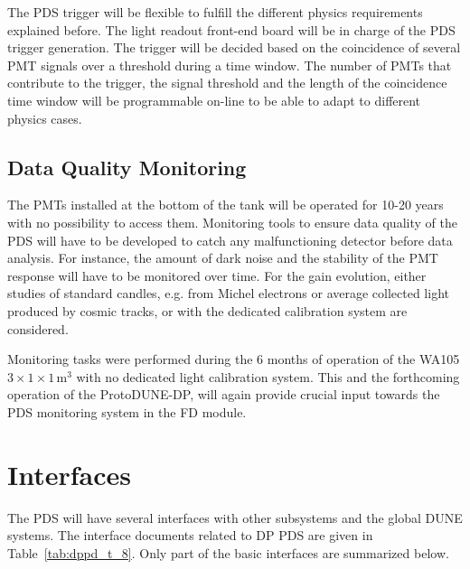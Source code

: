 The PDS trigger will be flexible to fulfill the different physics requirements explained before. The light readout front-end board will be in charge of the PDS trigger generation. The trigger will be decided based on the coincidence of several PMT signals over a threshold during a time window. The number of PMTs that contribute to the trigger, the signal threshold and the length of the coincidence time window will be programmable on-line to be able to adapt to different physics cases.


\subsection{Data Quality Monitoring}
\label{sec:fddp-pd-7.3}

The PMTs installed at the bottom of the tank will be operated for 10-20 years with no possibility to access them. Monitoring tools to ensure data quality of the PDS will have to be developed to catch any malfunctioning detector before data analysis. For instance, the amount of dark noise and the stability of the PMT response will have to be monitored over time. For the gain evolution, either studies of standard candles, e.g. from Michel electrons or average collected light produced by cosmic tracks, or with the dedicated calibration system are considered.

Monitoring tasks were performed during the 6 months of operation of the WA105 $3\times1\times1$\,m$^3$ with no dedicated light calibration system. This and the forthcoming operation of the ProtoDUNE-DP, will again provide crucial input towards the PDS monitoring system in the FD module.

\section{Interfaces}
\label{sec:fddp-pd-8}

The PDS will have several interfaces with other subsystems and the global DUNE systems. The interface documents related to DP PDS are given in Table~\ref{tab:dppd_t_8}. Only part of the basic interfaces are summarized below. 

